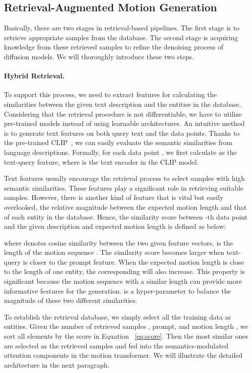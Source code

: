 \documentclass[10pt,twocolumn,letterpaper]{article}
\begin{document}
\subsection{Retrieval-Augmented Motion Generation}
\label{sec:retreival}


Basically, there are two stages in retrieval-based pipelines. The first stage is to retrieve appropriate samples from the database. The second stage is acquiring knowledge from these retrieved samples to refine the denoising process of diffusion models. We will thoroughly introduce these two steps.

\paragraph{Hybrid Retrieval.} To support this process, we need to extract features for calculating the similarities between the given text description and the entities in the database. Considering that the retrieval procedure is not differentiable, we have to utilize pre-trained models instead of using learnable architectures. An intuitive method is to generate text features on both query text and the data points. Thanks to the pre-trained CLIP~\cite{radford2021learning}, we can easily evaluate the semantic similarities from language descriptions. Formally, for each data point , we first calculate  as the text-query feature, where  is the text encoder in the CLIP model.

Text features usually encourage the retrieval process to select samples with high semantic similarities. 
These features play a significant role in retrieving suitable samples. However, there is another kind of feature that is vital but easily overlooked, the relative magnitude between the expected motion length and that of each entity in the database. Hence, the similarity score  between -th data point and the given description  and expected motion length  is defined as below:

where  denotes cosine similarity between the two given feature vectors,  is the length of the motion sequence . The similarity score  becomes larger when text-query is closer to the prompt feature. When the expected motion length is close to the length of one entity, the corresponding  will also increase. This property is significant because the motion sequence with a similar length can provide more informative features for the generation.  is a hyper-parameter to balance the magnitude of these two different similarities. 

To establish the retrieval database, we simply select all the training data as entities. Given the number of retrieved samples , prompt, and motion length , we sort all elements by the score  in Equation ~\ref{eq:score}. Then the most  similar ones are selected as the retrieved samples  and fed into the semantics-modulated attention components in the motion transformer. We will illustrate the detailed architecture in the next paragraph.
\end{document}
